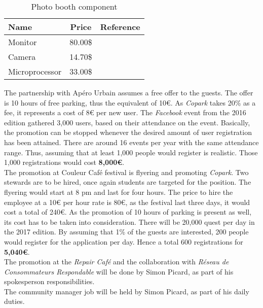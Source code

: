 \documentclass[12pt,a4paper,oneside]{book}
\newcommand{\bp}{\textit{Copark}}
\begin{document}
\begin{table}[h]
\centering
\caption{Photo booth component}
\label{pbcom}
\begin{tabular}{|l|c|c|}
\hline
\textbf{Name}   & \textbf{Price} & \textbf{Reference} \\ \hline
Monitor         & 80.00\$         & \cite{abmon}    \\ \hline
Camera          & 14.70\$         & \cite{abcam}     \\ \hline
Microprocessor & 33.00\$         & \cite{abmc}     \\ \hline
\end{tabular}
\end{table}

The partnership with Apéro Urbain assumes a free offer to the guests. The offer is 10 hours of free parking, thus the equivalent of 10\euro{}. As \bp{} takes 20\% as a fee, it represents a cost of 8\euro{} per new user. The \textit{Facebook} event from the 2016 edition gathered 3,000 users, based on their attendance on the event.\cite{fbau} Basically, the promotion can be stopped whenever the desired amount of user registration has been attained. There are around 16 events per year with the same attendance range. Thus, assuming that at least 1,000 people would register is realistic. Those 1,000 registrations would cost \textbf{8,000\euro{}}.\\


The promotion at Couleur Café festival is flyering and promoting \bp{}. Two stewards are to be hired, once again students are targeted for the position. The flyering would start at 8 pm and last for four hours. The price to hire the employee at a 10\euro{} per hour rate is 80\euro{}, as the festival last three days, it would cost a total of 240\euro{}. As the promotion of 10 hours of parking is present as well, its cost has to be taken into consideration. There will be 20,000 quest per day in the 2017 edition. By assuming that 1\% of the guests are interested, 200 people would register for the application per day. Hence a total 600 registrations for \textbf{5,040\euro{}}.\\

The promotion at the \textit{Repair Café} and the collaboration with \textit{Réseau de Consommateurs Respondable} will be done by Simon Picard, as part of his spokesperson responsibilities.\\

The community manager job will be held by Simon Picard, as part of his daily duties.\\
\end{document}
